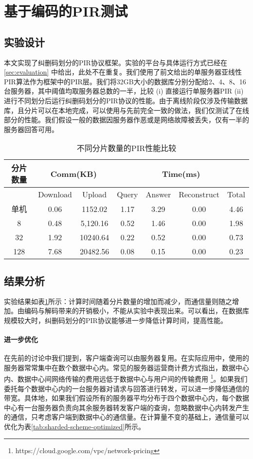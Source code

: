 \section{基于编码的PIR测试}
\subsection{实验设计}
本文实现了纠删码划分的PIR协议框架。实验的平台与具体运行方式已经在 \ref{sec:evaluation} 中给出，此处不在重复。我们使用了前文给出的单服务器亚线性PIR算法作为框架中的PIR层。我们将32GB大小的数据库分别分配给2、4、8、16台服务器，其中阈值均取服务器总数的一半，比较 (i) 直接运行单服务器PIR (ii) 进行不同划分后运行纠删码划分的PIR协议的性能。由于离线阶段仅涉及传输数据库，且分片可以在本地完成，可以使用与先前完全一致的做法，我们仅测试了在线部分的性能。我们假设一般的数据因服务器作恶或是网络故障被丢失，仅有一半的服务器回答可用。

\begin{table}[]
    \caption{不同分片数量的PIR性能比较}
    \label{tab:sharded-scheme}
    \centering
    \begin{tabular}{@{}c|cc|cccc@{}}
    \toprule
    分片数量 & \multicolumn{2}{c|}{Comm(KB)} & \multicolumn{4}{c}{Time(ms)}         \\ \midrule
         & Download      & Upload        & Query & Answer & Reconstruct & Total \\ \midrule
    单机   & 0.06          & 1152.02       & 1.17  & 3.29   & 0.00        & 4.46  \\
    8    & 0.48          & 5,120.16      & 0.52  & 1.46   & 0.00        & 1.98  \\
    32   & 1.92          & 10240.64      & 0.22  & 0.52   & 0.00        & 0.73  \\
    128  & 7.68          & 20482.56      & 0.08  & 0.15   & 0.00        & 0.23  \\ \bottomrule
    \end{tabular}
    \end{table}
\subsection{结果分析}

实验结果如表\ref{tab:sharded-scheme}所示：计算时间随着分片数量的增加而减少，而通信量则随之增加。由编码与解码带来的开销极小，不能从实验中表现出来。可以看出，在数据库规模较大时，纠删码划分的PIR协议能够进一步降低计算时间，提高性能。

\paragraph{进一步优化}
在先前的讨论中我们提到，客户端查询可以由服务器复用。在实际应用中，使用的服务器常常集中在数个数据中心内。常见的服务器运营商计费方式指出，数据中心内、数据中心间网络传输的费用远低于数据中心与用户间的传输费用 \footnote{https://cloud.google.com/vpc/network-pricing}。如果我们委托每个数据中心内的一台服务器对请求与回答进行转发，可以进一步降低通信的带宽。具体地，如果我们假设所有的服务器平均分布于四个数据中心内，每个数据中心有一台服务器负责向其余服务器转发客户端的查询，忽略数据中心内转发产生的通信，只考虑客户端到数据中心的通信量。在计算量不变的基础上，通信量可以优化为表\ref{tab:sharded-scheme-optimized}所示。

